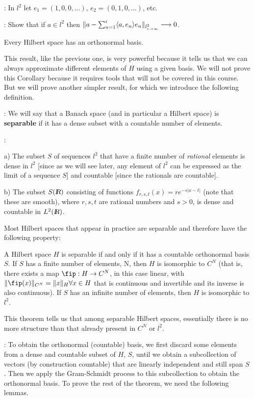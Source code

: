 \ejem: 
In $l^2$ let $e_1 = (1,0,0,...)$, $e_2 = (0,1,0,...)$, etc.

\ejer: 
Show that if $a \in l^2$ then 
$\|a-\sum_{n=1}^i\langle a,e_n\rangle e_n \|_{l^2_{i\to \infty}} \longrightarrow 0 $.

\bcor 
Every Hilbert space has an orthonormal basis.
\ecor

This result, like the previous one, is very powerful because it tells us that
we can always approximate different elements of $H$ using a given
basis. We will not prove this Corollary because it requires tools
that will not be covered in this course. But we will prove another simpler result,
for which we introduce the following definition.

: We will say that a Banach space (and in particular a
Hilbert space) is {\bf separable} if it has a dense subset with a countable
number of elements.

\noi {}:

a) The subset $S$ of sequences $l^2$ that have a finite
number of {\sl rational} elements is dense in $l^2$ [since as we will see
later, any element of $l^2$ can be expressed as the limit
of a sequence $S$] and countable [since the rationals are countable].

b) The subset $S(\mbox{\sl {l$\!\!\!\;\:\!$R}}{})$ consisting of functions 
$f_{r,s,t}(x) = re^{-s|x-t|}$ (note that these are smooth), where
$r,s,t$ are rational numbers and $s>0$, is dense and countable in 
$L^2(\mbox{\sl {l$\!\!\!\;\:\!$R}}{})$.

Most Hilbert spaces that appear in practice
are separable and therefore have the following property:

\bteo 
\label{teo7.2}
A Hilbert space $H$ is separable if and only if it has a countable orthonormal 
basis $S$. If $S$ has a finite number of elements,
N, then $H$ is isomorphic to $C^N$ (that is, there exists a map 
$\fip :H \rightarrow C^N$, in this case linear, with 
$\|\fip(x)\|_{C^N} = \|x\|_H \forall x \in H$ that is continuous and invertible
and its inverse is also continuous). 
If $S$ has an infinite number of elements, then $H$ is isomorphic
to $l^2$.
\eteo

This theorem tells us that among separable Hilbert spaces, essentially
there is no more structure than that already present in $C^N$ or $l^2$.
\espa

\pru: To obtain the orthonormal (countable) basis, we first
discard some elements from a dense and countable subset of $H$, $S$, 
until we obtain a subcollection of vectors (by construction
countable) that are linearly independent and still span $S$. 
Then we apply the Gram-Schmidt process to this subcollection
to obtain the orthonormal basis. To prove the rest of the theorem, 
we need the following lemmas.

